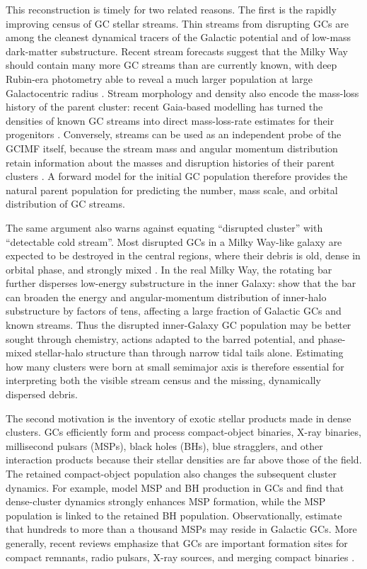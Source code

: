 \documentclass[fleqn,usenatbib]{mnras}
\begin{document}
This reconstruction is timely for two related reasons. The first is the rapidly improving census of GC stellar streams. Thin streams from disrupting GCs are among the cleanest dynamical tracers of the Galactic potential and of low-mass dark-matter substructure. Recent stream forecasts suggest that the Milky Way should contain many more GC streams than are currently known, with deep Rubin-era photometry able to reveal a much larger population at large Galactocentric radius \citep{Pearson2024Streams}. Stream morphology and density also encode the mass-loss history of the parent cluster: recent Gaia-based modelling has turned the densities of known GC streams into direct mass-loss-rate estimates for their progenitors \citep{Chen2025StreamsMassLoss}. Conversely, streams can be used as an independent probe of the GCIMF itself, because the stream mass and angular momentum distribution retain information about the masses and disruption histories of their parent clusters \citep{YeCarlberg2026StreamsGCIMF}. A forward model for the initial GC population therefore provides the natural parent population for predicting the number, mass scale, and orbital distribution of GC streams.

The same argument also warns against equating ``disrupted cluster'' with ``detectable cold stream''. Most disrupted GCs in a Milky Way-like galaxy are expected to be destroyed in the central regions, where their debris is old, dense in orbital phase, and strongly mixed \citep{Pearson2024Streams}. In the real Milky Way, the rotating bar further disperses low-energy substructure in the inner Galaxy: \citet{DillamoreSanders2025} show that the bar can broaden the energy and angular-momentum distribution of inner-halo substructure by factors of tens, affecting a large fraction of Galactic GCs and known streams. Thus the disrupted inner-Galaxy GC population may be better sought through chemistry, actions adapted to the barred potential, and phase-mixed stellar-halo structure than through narrow tidal tails alone. Estimating how many clusters were born at small semimajor axis is therefore essential for interpreting both the visible stream census and the missing, dynamically dispersed debris.

The second motivation is the inventory of exotic stellar products made in dense clusters. GCs efficiently form and process compact-object binaries, X-ray binaries, millisecond pulsars (MSPs), black holes (BHs), blue stragglers, and other interaction products because their stellar densities are far above those of the field. The retained compact-object population also changes the subsequent cluster dynamics. For example, \citet{Ye2019MSPBH} model MSP and BH production in GCs and find that dense-cluster dynamics strongly enhances MSP formation, while the MSP population is linked to the retained BH population. Observationally, \citet{ZhaoHeinke2022} estimate that hundreds to more than a thousand MSPs may reside in Galactic GCs. More generally, recent reviews emphasize that GCs are important formation sites for compact remnants, radio pulsars, X-ray sources, and merging compact binaries \citep{Kremer2025CompactObjects}.
\end{document}
